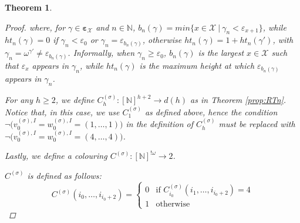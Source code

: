 \documentclass{amsart}
\newcommand\Nat{\mathbb{N}}
\newcommand{\LoX}{\mathcal{X}}
\newcommand\boldomega{\pmb{\omega}}
\newcommand\boldepsilon{\pmb{\varepsilon}}
\newtheorem{theorem}{Theorem}
\begin{document}
\begin{theorem}
\begin{proof}
%

where, for $\gamma \in \boldepsilon_\LoX$ and $n \in \Nat$, $b_n(\gamma) = min\{x \in \LoX\ |\ \gamma_n < \varepsilon_{x+1}\}$, while $ht_n(\gamma) = 0$ if $\gamma_n < \varepsilon_0$ or $\gamma_n = \varepsilon_{b_n(\gamma)}$, otherwise $ht_n(\gamma) = 1 + ht_n(\gamma')$, with $\gamma_n = \omega^{\gamma'} \neq \varepsilon_{b_n(\gamma)}$. Informally, when $\gamma_n \geq \varepsilon_0$, $b_n(\gamma)$ is the largest $x \in \LoX$ such that $\varepsilon_x$ appears in $\gamma_n$, while $ht_n(\gamma)$ is the maximum height at which $\varepsilon_{b_n(\gamma)}$ appears in $\gamma_n$.

\medskip

For any $h \geq 2$, we define $C_h^{(\sigma)} : [\Nat]^{h+2} \rightarrow d(h)$ as in Theorem \ref{prop:RTn}. Notice that, in this case, we use $C_1^{(\sigma)}$ as defined above, hence the condition $\neg\big(v_0^{(\sigma), I} = w_0^{(\sigma), I} = (1,\ldots,1)\big)$ in the definition of $C_h^{(\sigma)}$ must be replaced with $\neg\big(v_0^{(\sigma), I} = w_0^{(\sigma), I} = (4,\ldots,4)\big)$.


\medskip

Lastly, we define a colouring $C^{(\sigma)} : [\Nat]^{!\omega} \rightarrow 2$. %

$C^{(\sigma)}$ is defined as follows:
\begin{equation*}
C^{(\sigma)}(i_0, \ldots, i_{i_0+2}) = 
\begin{cases}
0&\text{if }C_{i_0}^{(\sigma)}(i_1, \ldots, i_{i_0+2}) = 4\\
1&\text{otherwise}


\end{cases}
\end{equation*}
\end{proof}
\end{theorem}
\end{document}
